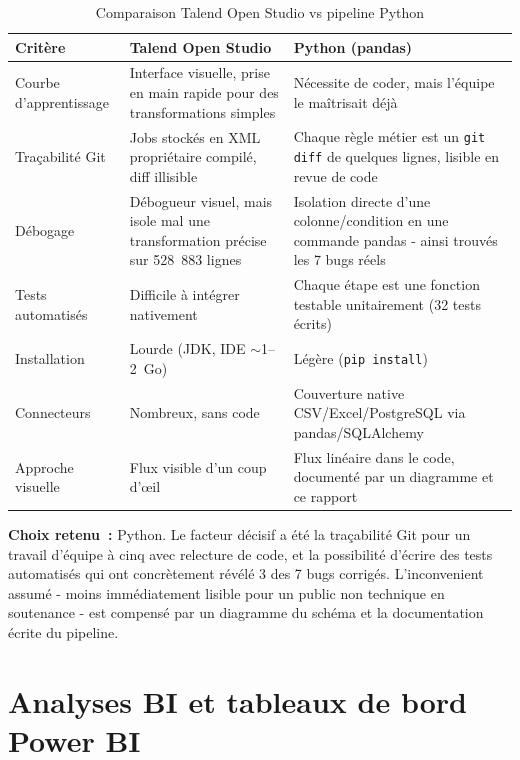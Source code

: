 \documentclass[11pt,a4paper]{report}
\begin{document}
\begin{table}[H]
\centering
\small
\begin{tabularx}{\linewidth}{lXX}
\toprule
\textbf{Crit\`ere} & \textbf{Talend Open Studio} & \textbf{Python (pandas)} \\
\midrule
Courbe d'apprentissage & Interface visuelle, prise en main rapide pour des
  transformations simples & N\'ecessite de coder, mais l'\'equipe le ma\^itrisait
  d\'ej\`a \\
Tra\c{c}abilit\'e Git & Jobs stock\'es en XML propri\'etaire compil\'e, diff
  illisible & Chaque r\`egle m\'etier est un \texttt{git diff} de quelques
  lignes, lisible en revue de code \\
D\'ebogage & D\'ebogueur visuel, mais isole mal une transformation pr\'ecise sur
  528~883 lignes & Isolation directe d'une colonne/condition en une commande
  pandas - ainsi trouv\'es les 7 bugs r\'eels \\
Tests automatis\'es & Difficile \`a int\'egrer nativement & Chaque \'etape est une
  fonction testable unitairement (32 tests \'ecrits) \\
Installation & Lourde (JDK, IDE $\sim$1--2~Go) & L\'eg\`ere (\texttt{pip
  install}) \\
Connecteurs & Nombreux, sans code & Couverture native CSV/Excel/PostgreSQL via
  pandas/SQLAlchemy \\
Approche visuelle & Flux visible d'un coup d'\oe il & Flux lin\'eaire dans le
  code, document\'e par un diagramme et ce rapport \\
\bottomrule
\end{tabularx}
\caption{Comparaison Talend Open Studio vs pipeline Python}
\label{tab:talend}
\end{table}

\textbf{Choix retenu~:} Python. Le facteur d\'ecisif a \'et\'e la tra\c{c}abilit\'e
Git pour un travail d'\'equipe \`a cinq avec relecture de code, et la
possibilit\'e d'\'ecrire des tests automatis\'es qui ont concr\`etement r\'ev\'el\'e
3 des 7 bugs corrig\'es. L'inconvenient assum\'e - moins imm\'ediatement lisible
pour un public non technique en soutenance - est compens\'e par un diagramme
du sch\'ema et la documentation \'ecrite du pipeline.

\chapter{Analyses BI et tableaux de bord Power BI}
\label{ch:powerbi}
\end{document}
